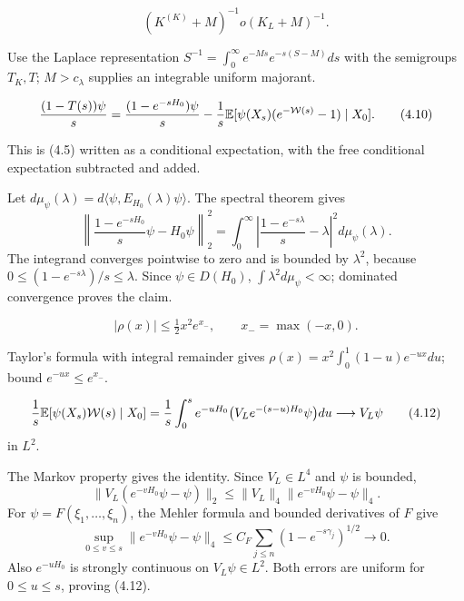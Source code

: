 \documentclass[11pt,a4paper]{article}
\newcommand{\D}{\mathcal D}
\begin{document}
\[
 (K^{(K)}+M)^{-1}	o(K_L+M)^{-1}.
\tag{4.9}
\]

\Because Use the Laplace representation
$S^{-1}=\int_0^\infty e^{-Ms}e^{-s(S-M)}ds$ with the semigroups
$T_K,T$; $M>c_\lambda$ supplies an integrable uniform majorant.


\QedStep


\LS{2}{1}{For $\psi\in\D$,}
\[
 \frac{(1-T(s))\psi}{s}
 =\frac{(1-e^{-sH_0})\psi}{s}
 -\frac1s\mathbb E[\psi(X_s)(e^{-\mathcal W(s)}-1)\mid X_0].
\tag{4.10}
\]

\Because This is (4.5) written as a conditional expectation, with the free
conditional expectation subtracted and added.


\Because Let $d\mu_\psi(\lambda)=d\langle\psi,E_{H_0}(\lambda)\psi\rangle$.
The spectral theorem gives
\[
 \left\|\frac{1-e^{-sH_0}}s\psi-H_0\psi\right\|_2^2
 =\int_0^\infty
 \left|\frac{1-e^{-s\lambda}}s-\lambda\right|^2d\mu_\psi(\lambda).
\]
The integrand converges pointwise to zero and is bounded by $\lambda^2$, because
$0\le(1-e^{-s\lambda})/s\le\lambda$.  Since $\psi\in D(H_0)$,
$\int\lambda^2d\mu_\psi<\infty$; dominated convergence proves the claim.

\[
 |\rho(x)|\le\tfrac12x^2e^{x_-},\qquad x_-=\max(-x,0).
\tag{4.11}
\]

\Because Taylor's formula with integral remainder gives
$\rho(x)=x^2\int_0^1(1-u)e^{-ux}du$; bound $e^{-ux}\le e^{x_-}$.

\[
 \frac1s\mathbb E[\psi(X_s)\mathcal W(s)\mid X_0]
 =\frac1s\int_0^s e^{-uH_0}
 \bigl(V_L e^{-(s-u)H_0}\psi\bigr)du
 \longrightarrow V_L\psi
\tag{4.12}
\]
in $L^2$.

\Because The Markov property gives the identity.  Since $V_L\in L^4$ and
$\psi$ is bounded,
\[
 \|V_L(e^{-vH_0}\psi-\psi)\|_2
 \le\|V_L\|_4\|e^{-vH_0}\psi-\psi\|_4.
\]
For $\psi=F(\xi_1,\ldots,\xi_n)$, the Mehler formula and bounded derivatives of
$F$ give
\[
 \sup_{0\le v\le s}\|e^{-vH_0}\psi-\psi\|_4
 \le C_F\sum_{j\le n}(1-e^{-s\gamma_j})^{1/2}\to0.
\]
Also $e^{-uH_0}$ is strongly continuous on $V_L\psi\in L^2$.  Both errors are
uniform for $0\le u\le s$, proving (4.12).
\end{document}
